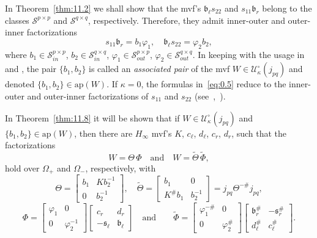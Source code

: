 \documentclass[12pt,twoside,a4paper]{amsart}
\theoremstyle{definition}
\numberwithin{equation}{section}
\begin{document}
In Theorem~\ref{thm:11.2} we shall show that the mvf's ${{\mathfrak b}}_{\ell}s_{22}$
and $s_{11}{{\mathfrak b}}_r$ belong to the classes ${\mathcal S}^{p\times p}$ and
${\mathcal S}^{q\times q}$,
respectively. Therefore, they admit inner-outer and outer-inner factorizations
\begin{equation}\label{eq:0.5}
    s_{11}{{\mathfrak b}}_r=b_1\varphi_1,\quad{{\mathfrak b}}_{\ell}s_{22}=\varphi_2b_2,
\end{equation}
where $b_1\in {\mathcal S}_{in}^{p\times p}$, $b_2\in {\mathcal S}_{in}^{q\times q}$, $\varphi_1\in
{\mathcal S}_{out}^{p\times p}$, $\varphi_2\in {\mathcal S}_{out}^{q\times q}$.
In keeping with the usage in \cite{ArovD97} and \cite{ArovD08},
the pair $\{b_1,b_2\}$ is called an
{\it associated pair} of the mvf
$W\in{{\mathcal U}}_\kappa^\circ(j_{pq})$ and denoted $\{b_1,b_2\}\in\mbox{ap}(W)$.
If $\kappa=0$, the
formulas in~\eqref{eq:0.5} reduce to the inner-outer
and outer-inner factorizations of $s_{11}$ and $s_{22}$
(see~\cite{Arov93},~\cite{ArovD97}).

In Theorem~\ref{thm:11.8} it will be shown that if
$W\in{{\mathcal U}}_\kappa^\circ(j_{pq})$ and   $\{b_1,b_2\}\in\mbox{ap}(W)$, then
there are $H_\infty$ mvf's $K$, $c_\ell$, $d_\ell$, $c_r$, $d_r$,
such that the factorizations
\begin{equation}
\label{eq:0.6}
W=\Theta\,\Phi\quad\text{and}\quad W={{{\widetilde {\Theta}} }}\,{{{\widetilde {\Phi}} }},
\end{equation}
hold over $\Omega_+$ and $\Omega_-$, respectively, with
\begin{equation}
\label{eq:0.7}
\Theta=\begin{bmatrix}b_1&Kb_2^{-1}\\0&b_2^{-1}\end{bmatrix},\quad
{{{\widetilde {\Theta}} }}=\begin{bmatrix}b_1&0\\K^\# b_1&b_2^{-1}\end{bmatrix}
=j_{pq}\Theta^{-\#}j_{pq},
\end{equation}
\begin{equation}
\label{eq:0.8} \Phi=
\begin{bmatrix}\varphi_1&0\\0&\varphi_2^{-1}\end{bmatrix}
\begin{bmatrix}c_r&d_r\\-{{\mathfrak s}}_\ell&{{\mathfrak b}}_\ell\end{bmatrix}\quad\textrm{and}\quad
\quad {{{\widetilde {\Phi}} }}=
\begin{bmatrix}\varphi_1^{-\#}&0\\0&\varphi_2^\#\end{bmatrix}
\begin{bmatrix}{{\mathfrak b}}_r^\#&-{{\mathfrak s}}_r^\#\\ d_\ell^\#&c_\ell^\#\end{bmatrix}.
\end{equation}
\end{document}

